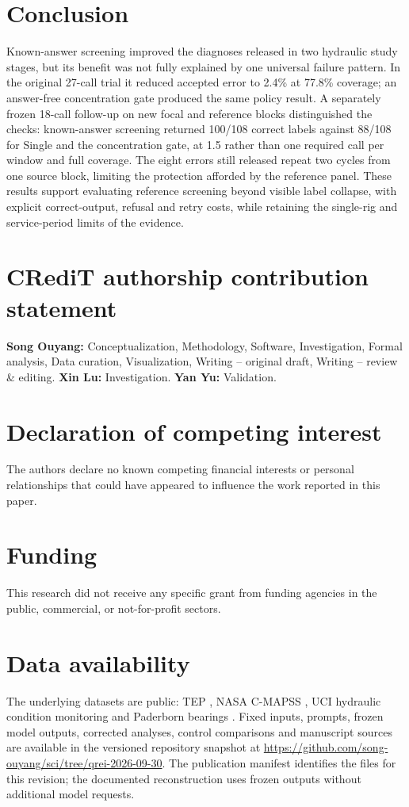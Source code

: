 \documentclass[11pt,a4paper]{article}
\begin{document}
\section{Conclusion}\label{sec:conclusion}
Known-answer screening improved the diagnoses released in two hydraulic study stages, but its benefit was not fully explained by one universal failure pattern. In the original 27-call trial it reduced accepted error to 2.4\% at 77.8\% coverage; an answer-free concentration gate produced the same policy result. A separately frozen 18-call follow-up on new focal and reference blocks distinguished the checks: known-answer screening returned 100/108 correct labels against 88/108 for Single and the concentration gate, at 1.5 rather than one required call per window and full coverage. The eight errors still released repeat two cycles from one source block, limiting the protection afforded by the reference panel. These results support evaluating reference screening beyond visible label collapse, with explicit correct-output, refusal and retry costs, while retaining the single-rig and service-period limits of the evidence.

\section*{CRediT authorship contribution statement}
\textbf{Song Ouyang:} Conceptualization, Methodology, Software, Investigation, Formal analysis, Data curation, Visualization, Writing -- original draft, Writing -- review \& editing. \textbf{Xin Lu:} Investigation. \textbf{Yan Yu:} Validation.

\section*{Declaration of competing interest}
The authors declare no known competing financial interests or personal relationships that could have appeared to influence the work reported in this paper.

\section*{Funding}
This research did not receive any specific grant from funding agencies in the public, commercial, or not-for-profit sectors.

\section*{Data availability}
The underlying datasets are public: TEP \citep{rieth2017additional}, NASA C-MAPSS \citep{saxena2008dataset}, UCI hydraulic condition monitoring \citep{helwig2015hydraulicdata} and Paderborn bearings \citep{lessmeier2016benchmark}. Fixed inputs, prompts, frozen model outputs, corrected analyses, control comparisons and manuscript sources are available in the versioned repository snapshot at \url{https://github.com/song-ouyang/sci/tree/qrei-2026-09-30}. The publication manifest identifies the files for this revision; the documented reconstruction uses frozen outputs without additional model requests.
\end{document}
